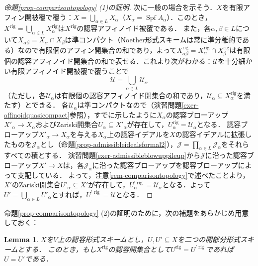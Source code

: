 \documentclass[a4paper,12pt, dvipdfmx]{jsbook}
\def\rig{\mathop{\mathrm{rig}}\nolimits}
\def\Spf{\mathop{\mathrm{Spf}}\nolimits}
\theoremstyle{plain}
\newtheorem{lem}[thm]{\bfseries Lemma}
\theoremstyle{definition}
\begin{document}
\begin{proof}[{\rm 命題\ref{prop-comparisontopology} (1)の証明}]
次に一般の場合を示そう．$X$を有限アフィン開被覆で覆う：$X=\bigcup_{\alpha\in L}X_{\alpha}$（$X_{\alpha}=\Spf A_{\alpha}$）．このとき，$X^{\rig}=\bigcup_{\alpha\in L}X^{\rig}_{\alpha}$は$X^{\rig}$の認容アフィノイド被覆である．
また，各$\alpha,\beta\in L$について$X_{\alpha\beta}=X_{\alpha}\cap X_{\beta}$は準コンパクト（Noether形式スキームは常に準分離的である）なので有限個のアフィン開集合の和であり，よって$X^{\rig}_{\alpha\beta}=X^{\rig}_{\alpha}\cap X^{\rig}_{\beta}$は有限個の認容アフィノイド開集合の和で表せる．これより次がわかる：$\mathcal{U}$を十分細かい有限アフィノイド開被覆で覆うことで
$$
\mathcal{U}=\bigcup_{\alpha\in L}\mathcal{U}_{\alpha}
$$
（ただし，各$\mathcal{U}_{\alpha}$は有限個の認容アフィノイド開集合の和であり，$\mathcal{U}_{\alpha}\subseteq X^{\rig}_{\alpha}$を満たす）とできる．
各$\mathcal{U}_{\alpha}$は準コンパクトなので（演習問題\ref{exer-affinoidquasicompact}参照），すでに示したように$X_{\alpha}$の認容ブローアップ$X'_{\alpha}\rightarrow X_{\alpha}$およびZariski開集合$U_{\alpha}\subseteq X'_{\alpha}$が存在して，$U^{\rig}_{\alpha}=\mathcal{U}_{\alpha}$となる．
認容ブローアップ$X'_{\alpha}\rightarrow X_{\alpha}$を与える$X_{\alpha}$上の認容イデアルを$X$の認容イデアルに拡張したものを$\mathscr{J}_{\alpha}$とし（命題\ref{prop-admissibleidealsformal2}），$\mathscr{J}=\prod_{\alpha\in L}\mathscr{J}_{\alpha}$をそれらすべての積とする．
演習問題\ref{exer-admissibleblowuppileup}から$\mathscr{J}$に沿った認容ブローアップ$X'\rightarrow X$は，各$\mathscr{J}_{\alpha}$に沿った認容ブローアップを認容ブローアップによって支配している．
よって，注意\ref{rem-comparisontopology}で述べたことより，$X'$のZariski開集合$U'_{\alpha}\subseteq X'$が存在して，$U^{\prime\rig}_{\alpha}=\mathcal{U}_{\alpha}$となる．よって$U'=\bigcup_{\alpha\in L}U'_{\alpha}$とすれば，$U^{\prime\rig}=\mathcal{U}$となる．
\end{proof}

 命題\ref{prop-comparisontopology} (2)の証明のために，次の補題をあらかじめ用意しておく：
\begin{lem}\label{lem-comparisontopology}{\rm 
$X$を$V$上の認容形式スキームとし，$U,U'\subseteq X$を二つの開部分形式スキームとする．
このとき，もし$X^{\rig}$の認容開集合として$U^{\rig}=U^{\prime\rig}$であれば$U=U'$である．}
\end{lem}
\end{document}
